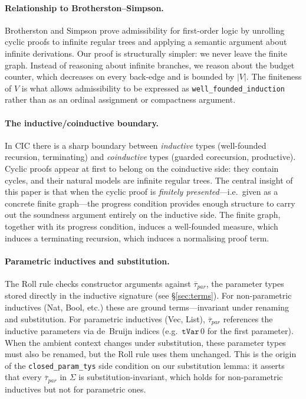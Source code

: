 \documentclass[runningheads]{llncs}
\begin{document}
\paragraph{Relationship to Brotherston--Simpson.}
Brotherston and Simpson prove admissibility for first-order logic by
unrolling cyclic proofs to infinite regular trees and applying a semantic
argument about infinite derivations.  Our proof is structurally simpler: we
never leave the finite graph.  Instead of reasoning about infinite branches,
we reason about the budget counter, which decreases on every back-edge and
is bounded by $|V|$.  The finiteness of $V$ is what allows admissibility to
be expressed as \texttt{well\_founded\_induction} rather than as an ordinal
assignment or compactness argument.

\paragraph{The inductive/coinductive boundary.}
In CIC there is a sharp boundary between \emph{inductive} types
(well-founded recursion, terminating) and \emph{coinductive} types (guarded
corecursion, productive).  Cyclic proofs appear at first to belong on the
coinductive side: they contain cycles, and their natural models are infinite
regular trees.  The central insight of this paper is that when the cyclic
proof is \emph{finitely presented}---i.e.\ given as a concrete finite
graph---the progress condition provides enough structure to carry out the
soundness argument entirely on the inductive side.  The finite graph,
together with its progress condition, induces a well-founded measure, which
induces a terminating recursion, which induces a normalising proof term.

\paragraph{Parametric inductives and substitution.}
The Roll rule checks constructor arguments against $\overline{\tau}_{\!\textit{par}}$,
the parameter types stored directly in the inductive signature (see
\S\ref{sec:terms}).  For non-parametric inductives (Nat, Bool, etc.)
these are ground terms---invariant under renaming and substitution.
For parametric inductives (Vec, List), $\overline{\tau}_{\!\textit{par}}$
references the inductive parameters via de~Bruijn indices (e.g.\
$\texttt{tVar}\,0$ for the first parameter).
When the ambient context changes under substitution, these parameter
types must also be renamed, but the Roll rule uses them unchanged.
This is the origin of the \texttt{closed\_param\_tys} side condition on
our substitution lemma: it asserts that every $\overline{\tau}_{\!\textit{par}}$
in $\Sigma$ is substitution-invariant, which holds for non-parametric
inductives but not for parametric ones.
\end{document}
